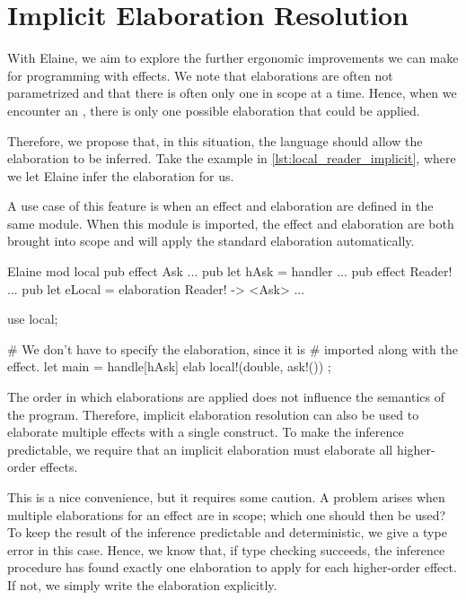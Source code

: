 \chapter{Implicit Elaboration Resolution}\label{chap:elabres}


With Elaine, we aim to explore the further ergonomic improvements we can make for programming with effects. We note that elaborations are often not parametrized and that there is often only one in scope at a time. Hence, when we encounter an \elab, there is only one possible elaboration that could be applied.

Therefore, we propose that, in this situation, the language should allow the elaboration to be inferred. Take the example in \cref{lst:local_reader_implicit}, where we let Elaine infer the elaboration for us.


A use case of this feature is when an effect and elaboration are defined in the same module. When this module is imported, the effect and elaboration are both brought into scope and  will apply the standard elaboration automatically.

\begin{lst}{Elaine}
mod local {
    pub effect Ask { ... }
    pub let hAsk = handler { ... }
    pub effect Reader! { ... }
    pub let eLocal = elaboration Reader! -> <Ask> { ... }
}

use local;

# We don't have to specify the elaboration, since it is
# imported along with the effect.
let main = handle[hAsk] elab { local!(double, ask!()) };
\end{lst}

The order in which elaborations are applied does not influence the semantics of the program. Therefore, implicit elaboration resolution can also be used to elaborate multiple effects with a single  construct. To make the inference predictable, we require that an implicit elaboration must elaborate all higher-order effects.

This is a nice convenience, but it requires some caution. A problem arises when multiple elaborations for an effect are in scope; which one should then be used? To keep the result of the inference predictable and deterministic, we give a type error in this case. Hence, we know that, if type checking succeeds, the inference procedure has found exactly one elaboration to apply for each higher-order effect. If not, we simply write the elaboration explicitly.

